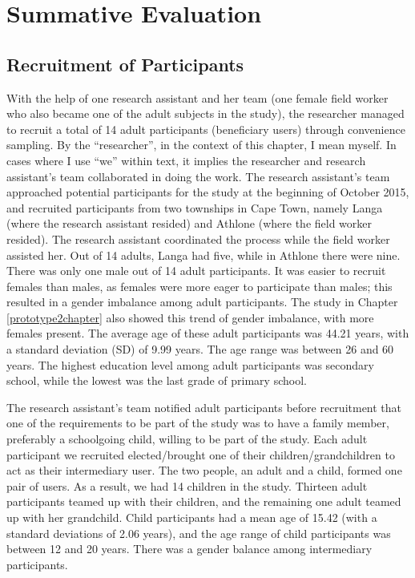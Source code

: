 
\chapter{Summative Evaluation} %

\label{summativeevalchapter} %


\section{Recruitment of Participants}
With the help of one research assistant and her team (one female field worker who also became one of the adult subjects in the study), the researcher managed to recruit a total of 14 adult participants (beneficiary users) through convenience sampling. By the ``researcher'', in the context of this chapter, I mean myself. In cases where I use ``we'' within text, it implies the researcher and research assistant's team collaborated in doing the work. The research assistant's team approached potential participants for the study at the beginning of  October 2015, and recruited participants from two townships in Cape Town, namely Langa (where the research assistant resided) and Athlone (where the field worker resided). The research assistant coordinated the process while the field worker assisted her. Out of 14 adults, Langa had five, while in Athlone there were nine. There was only one male out of 14 adult participants. It was easier to  recruit females than males, as females were more eager to participate than males; this resulted in a gender imbalance among adult participants.  The study in Chapter \ref{prototype2chapter} also showed this trend of gender imbalance, with more females present. The average age of these adult participants was 44.21 years, with a standard deviation (SD) of 9.99 years. The age range was between 26 and 60 years. The highest education level among adult participants was secondary school, while the lowest was the last grade of primary school. 

The research assistant's team notified adult participants before recruitment that one of the requirements to be part of the study was to have a family member, preferably a schoolgoing child, willing to be part of the study. Each adult participant we recruited elected/brought one of their children/grandchildren to act as their intermediary user. The two people, an adult and a child, formed one pair of users. As a result, we had 14 children in the study. Thirteen adult participants teamed up with their children, and the remaining one adult teamed up with her grandchild. Child participants had a mean age of 15.42 (with a standard deviations of 2.06 years), and the age range of child participants was between 12  and 20 years. There was a gender balance among intermediary participants. 

